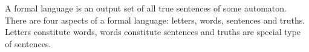 \documentclass[letterpaper, 10pt]{article}
\begin{document}
	A formal language is an output set of all true sentences of some automaton.
	There are four aspects of a formal language: letters, words, sentences and
	truths. Letters constitute words, words constitute sentences and truths are
	special type of sentences.
\end{document}
